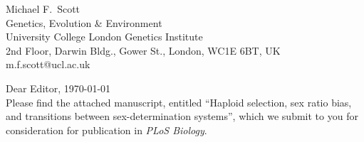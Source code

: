 \documentclass[12pt,letterpaper]{article}
\begin{document}
\thispagestyle{empty}

\noindent Michael F.\ Scott\\
Genetics, Evolution \& Environment\\
University College London Genetics Institute\\
2nd Floor, Darwin Bldg., Gower St., London, WC1E 6BT, UK\\
 m.f.scott@ucl.ac.uk\\


\noindent Dear Editor, \hfill \today \\

Please find the attached manuscript, entitled ``Haploid selection, sex ratio bias, and transitions between sex-determination systems'', which we submit to you for consideration for publication in \textit{PLoS Biology}.
\\
\end{document}
